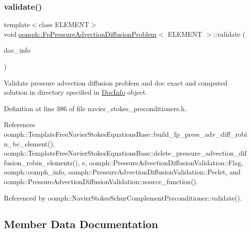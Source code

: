 \subsubsection{\texorpdfstring{validate()}{validate()}}
{\footnotesize\ttfamily template$<$class E\+L\+E\+M\+E\+NT$>$ \\
void \hyperlink{classoomph_1_1FpPressureAdvectionDiffusionProblem}{oomph\+::\+Fp\+Pressure\+Advection\+Diffusion\+Problem}$<$ E\+L\+E\+M\+E\+NT $>$\+::validate (\begin{DoxyParamCaption}\item[{\hyperlink{classoomph_1_1DocInfo}{Doc\+Info} \&}]{doc\+\_\+info }\end{DoxyParamCaption})\hspace{0.3cm}{\ttfamily [inline]}}



Validate pressure advection diffusion problem and doc exact and computed solution in directory specified in \hyperlink{classoomph_1_1DocInfo}{Doc\+Info} object. 



Definition at line 386 of file navier\+\_\+stokes\+\_\+preconditioners.\+h.



References oomph\+::\+Template\+Free\+Navier\+Stokes\+Equations\+Base\+::build\+\_\+fp\+\_\+press\+\_\+adv\+\_\+diff\+\_\+robin\+\_\+bc\+\_\+element(), oomph\+::\+Template\+Free\+Navier\+Stokes\+Equations\+Base\+::delete\+\_\+pressure\+\_\+advection\+\_\+diffusion\+\_\+robin\+\_\+elements(), e, oomph\+::\+Pressure\+Advection\+Diffusion\+Validation\+::\+Flag, oomph\+::oomph\+\_\+info, oomph\+::\+Pressure\+Advection\+Diffusion\+Validation\+::\+Peclet, and oomph\+::\+Pressure\+Advection\+Diffusion\+Validation\+::source\+\_\+function().



Referenced by oomph\+::\+Navier\+Stokes\+Schur\+Complement\+Preconditioner\+::validate().



\subsection{Member Data Documentation}
\mbox{\label{classoomph_1_1FpPressureAdvectionDiffusionProblem_ad2e52d2785ab08702684bab80542bbd8}} 
